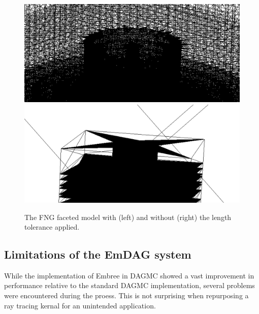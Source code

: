 \documentclass[10pt, a4paper]{article}
\begin{document}
\begin{figure}[H]
  \small
  \begin{center}
    \includegraphics[scale=0.15]{fng_len_tol.png}
    \includegraphics[scale=0.15]{fng_facet_tol.png}
    \caption{The FNG faceted model with (left) and without (right) the length tolerance applied.}
    \label{fng-faceted-models}
  \end{center}

\end{figure}



\subsection{Limitations of the EmDAG system}%

While the implementation of Embree in DAGMC showed a vast improvement in performance relative to the standard DAGMC implementation, several problems were encountered during the proess. This is not surprising when repurposing a ray tracing kernal for an unintended application.
\end{document}
